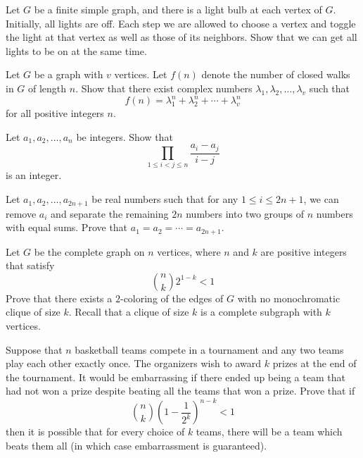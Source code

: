\documentclass[12pt]{article}
\begin{document}
        \begin{exercise}
            Let $G$ be a finite simple graph, and there is a light bulb at each vertex of $G$. Initially, all lights are off. Each step we are allowed to choose a vertex and toggle the light at that vertex as well as those of its neighbors. Show that we can get all lights to be on at the same time.
        \end{exercise}
            
        \begin{exercise}
            Let $G$ be a graph with $v$ vertices. Let $f(n)$ denote the number of closed walks in $G$ of length $n$. Show that there exist complex numbers $\lambda_1,\lambda_2,\dots,\lambda_v$ such that
            \[f(n)=\lambda_1^n+\lambda_2^n+\cdots +\lambda_v^n\] for all positive integers $n$. 
        \end{exercise}
            
        \begin{exercise}
            Let $a_1,a_2,\dots,a_n$ be integers. Show that
            \[\prod_{1\leq i<j\leq n}\frac{a_i-a_j}{i-j}\] is an integer.
        \end{exercise}
            
        \begin{exercise}
            Let $a_1,a_2,\dots,a_{2n+1}$ be real numbers such that for any $1\leq i \leq 2n+1$, we can remove $a_i$ and separate the remaining $2n$ numbers into two groups of $n$ numbers with equal sums. Prove that $a_1=a_2=\cdots=a_{2n+1}$.
        \end{exercise}

        \begin{exercise}
            Let $G$ be the complete graph on $n$ vertices, where $n$ and $k$ are positive integers that satisfy
            \[\binom{n}{k}2^{1-k}<1
            \] Prove that there exists a $2$-coloring of the edges of $G$ with no monochromatic clique of size $k$. Recall that a clique of size \(k\) is a complete subgraph with \(k\) vertices.
        \end{exercise}
            
        \begin{exercise}
            Suppose that $n$ basketball teams compete in a tournament and any two teams play each other exactly once. The organizers wish to award $k$ prizes at the end of the tournament. It would be embarrassing if there ended up being a team that had not won a prize despite beating all the teams that won a prize. Prove that if
            \[\binom{n}{k}\left(1-\frac{1}{2^k}\right)^{n-k}<1\] then it is possible that for every choice of $k$ teams, there will be a team which beats them all (in which case embarrassment is guaranteed).
        \end{exercise}
            
\end{document}

